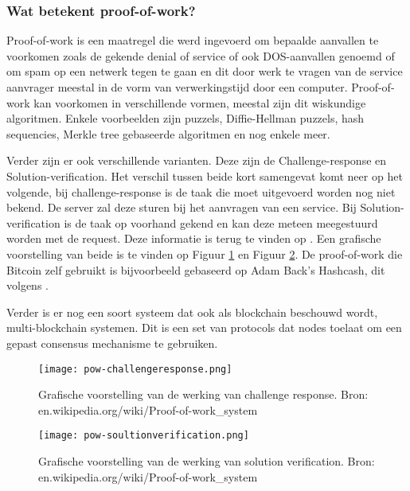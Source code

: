 \subsubsection{Wat betekent proof-of-work?}
Proof-of-work is een maatregel die werd ingevoerd om bepaalde aanvallen te voorkomen zoals de gekende denial of service of ook DOS-aanvallen genoemd of om spam op een netwerk tegen te gaan en dit door werk te vragen van de service aanvrager meestal in de vorm van verwerkingstijd door een computer. Proof-of-work kan voorkomen in verschillende vormen, meestal zijn dit wiskundige algoritmen. Enkele voorbeelden zijn puzzels, Diffie-Hellman puzzels, hash sequencies, Merkle tree gebaseerde algoritmen en nog enkele meer. 

Verder zijn er ook verschillende varianten. Deze zijn de Challenge-response en Solution-verification. Het verschil tussen beide kort samengevat komt neer op het volgende, bij challenge-response is de taak die moet uitgevoerd worden nog niet bekend. De server zal deze sturen bij het aanvragen van een service. Bij Solution-verification is de taak op voorhand gekend en kan deze meteen meegestuurd worden met de request. Deze informatie is terug te vinden op  \textcite{Wikipedia-POW}. Een grafische voorstelling van beide is te vinden op Figuur \ref{fig:pow-challengeresponse} en Figuur \ref{fig:pow-solutionverification}. De proof-of-work die Bitcoin zelf gebruikt is bijvoorbeeld gebaseerd op Adam Back's Hashcash, dit volgens \textcite{Nakamoto2008}.

Verder is er nog een soort systeem dat ook als blockchain beschouwd wordt, multi-blockchain systemen. Dit is een set van protocols dat nodes toelaat om een gepast consensus mechanisme te gebruiken. 

\begin{figure}
	\texttt{[image: pow-challengeresponse.png]}
	\caption{Grafische voorstelling van de werking van challenge response. Bron: en.wikipedia.org/wiki/Proof-of-work\_system}
	\label{fig:pow-challengeresponse}
\end{figure}

\begin{figure}
	\texttt{[image: pow-soultionverification.png]}
	\caption{Grafische voorstelling van de werking van solution verification. Bron: en.wikipedia.org/wiki/Proof-of-work\_system}
	\label{fig:pow-solutionverification}
\end{figure}

